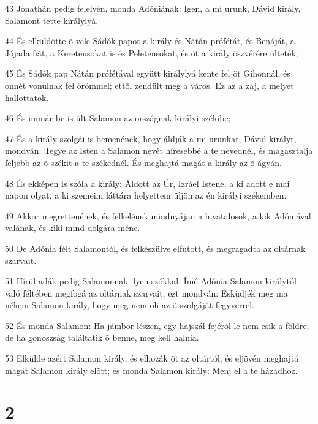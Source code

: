 \par 43 Jonathán pedig felelvén, monda Adóniának: Igen, a mi urunk, Dávid király, Salamont tette királylyá.
\par 44 És elküldötte õ vele Sádók papot a király és Nátán prófétát, és Benáját, a Jójada fiát, a Kereteusokat is és Peleteusokat, és õt a király öszvérére ülteték,
\par 45 És Sádók pap Nátán prófétával együtt királylyá kente fel õt Gihonnál, és onnét vonulnak fel örömmel; ettõl zendült meg a város. Ez az a zaj, a melyet hallottatok.
\par 46 És immár be is ült Salamon az országnak királyi székibe;
\par 47 És a király szolgái is bemenének, hogy áldják a mi urunkat, Dávid királyt, mondván: Tegye az Isten a Salamon nevét híresebbé a te nevednél, és magasztalja feljebb az õ székit a te székednél. És meghajtá magát a király az õ ágyán.
\par 48 És ekképen is szóla a király: Áldott az Úr, Izráel Istene, a ki adott e mai napon olyat, a ki szemeim láttára helyettem üljön az én királyi székemben.
\par 49 Akkor megrettenének, és felkelének mindnyájan a hivatalosok, a kik Adóniával valának, és kiki mind dolgára méne.
\par 50 De Adónia félt Salamontól, és felkészülve elfutott, és megragadta az oltárnak szarvait.
\par 51 Hírül adák pedig Salamonnak ilyen szókkal: Ímé Adónia Salamon királytól való féltében megfogá az oltárnak szarvait, ezt mondván: Esküdjék meg ma nékem Salamon király, hogy meg nem öli az õ szolgáját fegyverrel.
\par 52 És monda Salamon: Ha jámbor lészen, egy hajszál fejérõl le nem esik a földre; de ha gonoszság találtatik õ benne,  meg kell halnia.
\par 53 Elkülde azért Salamon király, és elhozák õt az oltártól; és eljövén meghajtá magát Salamon király elõtt; és monda Salamon király: Menj el a te házadhoz.

\chapter{2}

